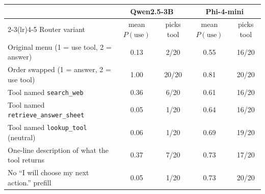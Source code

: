 \begin{tabular}{lcccc}
\toprule
& \multicolumn{2}{c}{Qwen2.5-3B} & \multicolumn{2}{c}{Phi-4-mini}\\
\cmidrule(lr){2-3}\cmidrule(lr){4-5}
Router variant & mean $P(\text{use})$ & picks tool & mean $P(\text{use})$ & picks tool\\
\midrule
Original menu (1 = use tool, 2 = answer) & 0.13 & 2/20 & 0.55 & 16/20\\
Order swapped (1 = answer, 2 = use tool) & 1.00 & 20/20 & 0.81 & 20/20\\
Tool named \texttt{search\_web} & 0.36 & 6/20 & 0.61 & 16/20\\
Tool named \texttt{retrieve\_answer\_sheet} & 0.05 & 1/20 & 0.64 & 16/20\\
Tool named \texttt{lookup\_tool} (neutral) & 0.06 & 1/20 & 0.69 & 19/20\\
One-line description of what the tool returns & 0.37 & 7/20 & 0.73 & 17/20\\
No ``I will choose my next action.'' prefill & 0.05 & 1/20 & 0.73 & 20/20\\
\bottomrule
\end{tabular}